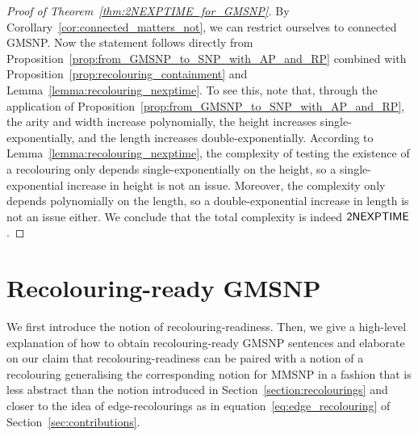 \documentclass[oneside,reqno,12pt]{amsart}
\theoremstyle{plain}
\theoremstyle{remark}
\newcommand{\TWONEXPTIME}{{\textup{\textsf{2NEXPTIME}}}\xspace}
\begin{document}
{\begin{proof}[Proof of Theorem~\ref{thm:2NEXPTIME_for_GMSNP}] 
 By Corollary~\ref{cor:connected_matters_not}, we can restrict ourselves to connected GMSNP.
Now the statement follows directly from Proposition~\ref{prop:from_GMSNP_to_SNP_with_AP_and_RP} combined with Proposition~\ref{prop:recolouring_containment} and Lemma~\ref{lemma:recolouring_nexptime}.
To see this, note that, through the application of Proposition~\ref{prop:from_GMSNP_to_SNP_with_AP_and_RP}, the arity and width increase polynomially, the height increases single-exponentially, and the length increases double-exponentially.
According to Lemma~\ref{lemma:recolouring_nexptime}, the complexity of testing the existence of a recolouring only depends single-exponentially on the height, so a single-exponential increase in height is not an issue.
Moreover, the complexity only depends polynomially on the length, so a double-exponential increase in length is not an issue either.
We conclude that the total complexity is indeed $\TWONEXPTIME$.
\end{proof}

 
\section{Recolouring-ready GMSNP} \label{section:recolouring_ready}
We first introduce the notion of recolouring-readiness.   
Then, we give a high-level explanation of how to obtain recolouring-ready GMSNP sentences and elaborate on our claim that recolouring-readiness can be paired with a notion of a recolouring generalising the corresponding notion for MMSNP in a fashion that is less abstract than the notion introduced in Section~\ref{section:recolourings} and   closer to the idea of edge-recolourings as in equation~\eqref{eq:edge_recolouring} of Section~\ref{sec:contributions}.



}
\end{document}
